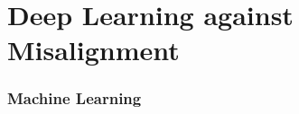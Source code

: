 \section{Deep Learning against Misalignment}
\begin{frame}
\frametitle{Machine Learning}

\end{frame}
